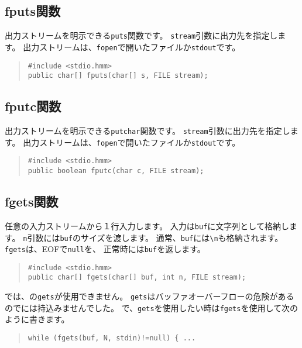 \subsection{fputs関数}

出力ストリームを明示できる\verb/puts/関数です。
\verb/stream/引数に出力先を指定します。
出力ストリームは、\verb/fopen/で開いたファイルか\verb/stdout/です。

\begin{quote}
\begin{verbatim}
#include <stdio.hmm>
public char[] fputs(char[] s, FILE stream);
\end{verbatim}
\end{quote}

\subsection{fputc関数}

出力ストリームを明示できる\verb/putchar/関数です。
\verb/stream/引数に出力先を指定します。
出力ストリームは、\verb/fopen/で開いたファイルか\verb/stdout/です。

\begin{quote}
\begin{verbatim}
#include <stdio.hmm>
public boolean fputc(char c, FILE stream);
\end{verbatim}
\end{quote}

\subsection{fgets関数}

任意の入力ストリームから１行入力します。
入力は\verb/buf/に文字列として格納します。
\verb/n/引数には\verb/buf/のサイズを渡します。
通常、\verb/buf/には\verb/\n/も格納されます。
\verb/fgets/は、EOFで\verb/null/を、
正常時には\verb/buf/を返します。

\begin{quote}
\begin{verbatim}
#include <stdio.hmm>
public char[] fgets(char[] buf, int n, FILE stream);
\end{verbatim}
\end{quote}

\cmm では、\cl の\verb/gets/が使用できません。
\verb/gets/はバッファオーバーフローの危険があるので\cmm には持込みませんでした。
\cmm で、\verb/gets/を使用したい時は\verb/fgets/を使用して次のように書きます。

\begin{quote}
\begin{verbatim}
while (fgets(buf, N, stdin)!=null) { ...
\end{verbatim}
\end{quote}


